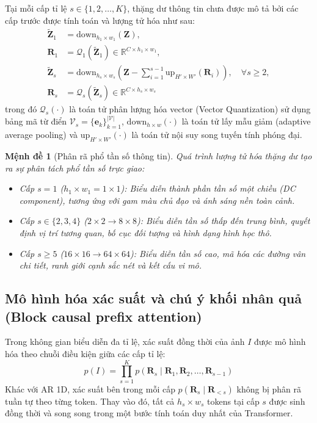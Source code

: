 \documentclass[10pt,twocolumn,letterpaper]{article}
\newtheorem{proposition}{Mệnh đề}
\begin{document}
Tại mỗi cấp tỉ lệ $s \in \{1, 2, \dots, K\}$, thặng dư thông tin chưa được mô tả bởi các cấp trước được tính toán và lượng tử hóa như sau:
\begin{align}
\widetilde{\mathbf{Z}}_1 &= \text{down}_{h_1 \times w_1}(\mathbf{Z}), \\
\mathbf{R}_1 &= \mathcal{Q}_1(\widetilde{\mathbf{Z}}_1) \in \mathbb{R}^{C \times h_1 \times w_1}, \\
\widetilde{\mathbf{Z}}_s &= \text{down}_{h_s \times w_s} \left( \mathbf{Z} - \sum_{i=1}^{s-1} \text{up}_{H' \times W'}(\mathbf{R}_i) \right), \quad \forall s \ge 2, \\
\mathbf{R}_s &= \mathcal{Q}_s(\widetilde{\mathbf{Z}}_s) \in \mathbb{R}^{C \times h_s \times w_s} \label{eq:var_rq}
\end{align}
trong đó $\mathcal{Q}_s(\cdot)$ là toán tử phân lượng hóa vector (Vector Quantization) sử dụng bảng mã từ điển $\mathcal{V}_s = \{\mathbf{e}_k\}_{k=1}^{|\mathcal{V}|}$, $\text{down}_{h \times w}(\cdot)$ là toán tử lấy mẫu giảm (adaptive average pooling) và $\text{up}_{H' \times W'}(\cdot)$ là toán tử nội suy song tuyến tính phóng đại.

\begin{proposition}[Phân rã phổ tần số thông tin]
Quá trình lượng tử hóa thặng dư tạo ra sự phân tách phổ tần số trực giao:
\begin{itemize}
    \item Cấp $s=1$ ($h_1 \times w_1 = 1 \times 1$): Biểu diễn thành phần tần số một chiều (DC component), tương ứng với gam màu chủ đạo và ánh sáng nền toàn cảnh.
    \item Cấp $s \in \{2, 3, 4\}$ ($2 \times 2 \to 8 \times 8$): Biểu diễn tần số thấp đến trung bình, quyết định vị trí tương quan, bố cục đối tượng và hình dạng hình học thô.
    \item Cấp $s \ge 5$ ($16 \times 16 \to 64 \times 64$): Biểu diễn tần số cao, mã hóa các đường vân chi tiết, ranh giới cạnh sắc nét và kết cấu vi mô.
\end{itemize}
\end{proposition}

\subsection{Mô hình hóa xác suất và chú ý khối nhân quả (Block causal prefix attention)}
Trong không gian biểu diễn đa tỉ lệ, xác suất đồng thời của ảnh $I$ được mô hình hóa theo chuỗi điều kiện giữa các cấp tỉ lệ:
\begin{equation}
p(I) = \prod_{s=1}^{K} p(\mathbf{R}_s \mid \mathbf{R}_1, \mathbf{R}_2, \dots, \mathbf{R}_{s-1})
\end{equation}
Khác với AR 1D, xác suất bên trong mỗi cấp $p(\mathbf{R}_s \mid \mathbf{R}_{<s})$ không bị phân rã tuần tự theo từng token. Thay vào đó, tất cả $h_s \times w_s$ tokens tại cấp $s$ được sinh đồng thời và song song trong một bước tính toán duy nhất của Transformer.
\end{document}
